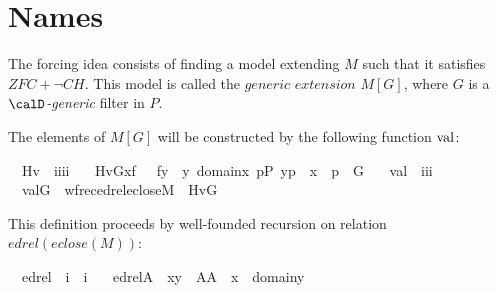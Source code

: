 \section{Names}



The forcing idea consists of finding a model extending $M$ such that
it satisfies $ZFC + \neg CH$. This model is called the $\textit{generic extension}$
$M[G]$, where $G$ is a \emph{$\calD$-generic} filter in $P$.

The elements of $M[G]$ will be constructed by the following function $\operatorname{val}$:

\begin{isabelle}
\isamarkupfalse%
\isanewline
\ \ Hv\ {\isacharcolon}{\isacharcolon}\ {\isachardoublequoteopen}i{\isasymRightarrow}i{\isasymRightarrow}i{\isasymRightarrow}i{\isachardoublequoteclose}\ \isanewline
\ \ {\isachardoublequoteopen}Hv{\isacharparenleft}G{\isacharcomma}x{\isacharcomma}f{\isacharparenright}\ {\isacharequal}{\isacharequal}\ {\isacharbraceleft}\ f{\isacharbackquote}y\ {\isachardot}{\isachardot}\ y{\isasymin}\ domain{\isacharparenleft}x{\isacharparenright}{\isacharcomma}\ {\isasymexists}p{\isasymin}P{\isachardot}\ {\isacharless}y{\isacharcomma}p{\isachargreater}\ {\isasymin}\ x\ {\isasymand}\ p\ {\isasymin}\ G\ {\isacharbraceright}{\isachardoublequoteclose}\isanewline
\isanewline
{}\isamarkupfalse%
\isanewline
\ \ val\ {\isacharcolon}{\isacharcolon}\ {\isachardoublequoteopen}i{\isasymRightarrow}i{\isasymRightarrow}i{\isachardoublequoteclose}\ \isanewline
\ \ {\isachardoublequoteopen}val{\isacharparenleft}G{\isacharcomma}{\isasymtau}{\isacharparenright}\ {\isacharequal}{\isacharequal}\ wfrec{\isacharparenleft}edrel{\isacharparenleft}eclose{\isacharparenleft}M{\isacharparenright}{\isacharparenright}{\isacharcomma}\ {\isasymtau}\ {\isacharcomma}Hv{\isacharparenleft}G{\isacharparenright}{\isacharparenright}{\isachardoublequoteclose}\isanewline
\isanewline
\end{isabelle}


This definition proceeds by well-founded recursion on relation $edrel(eclose(M))$:

\begin{isabelle}
\isamarkupfalse%
\isanewline
\ \ edrel\ {\isacharcolon}{\isacharcolon}\ {\isachardoublequoteopen}i\ {\isasymRightarrow}\ i{\isachardoublequoteclose}\ \isanewline
\ \ {\isachardoublequoteopen}edrel{\isacharparenleft}A{\isacharparenright}\ {\isacharequal}{\isacharequal}\ {\isacharbraceleft}{\isacharless}x{\isacharcomma}y{\isachargreater}\ {\isasymin}\ A{\isacharasterisk}A\ {\isachardot}\ x\ {\isasymin}\ domain{\isacharparenleft}y{\isacharparenright}{\isacharbraceright}{\isachardoublequoteclose}
\end{isabelle}

